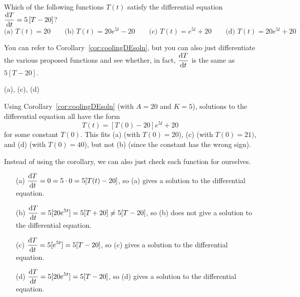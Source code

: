 %
%


\subsection*{\Conceptual}

\begin{Mquestion}
Which of the following functions $T(t)$ satisfy the differential equation
$\ds\diff{T}{t}=5\left[T-20\right]$?
\[\mbox{(a) }
T(t)=20
\qquad
\mbox{(b) }
 T(t)=20e^{5t}-20
\qquad
\mbox{(c) }
 T(t)=e^{5t}+20
\qquad
\mbox{(d) }
 T(t)=20e^{5t}+20
\]
\end{Mquestion}
\begin{hint}
You can refer to Corollary~\ref*{cor:coolingDEsoln},
but you can also just differentiate the various proposed functions and see whether, in fact, $\ds\diff{T}{t}$ is the same as $5[T-20]$.
\end{hint}
\begin{answer} (a), (c), (d)
\end{answer}
\begin{solution}
Using Corollary~\ref*{cor:coolingDEsoln} (with $A=20$ and $K=5$),  solutions to the differential equation all have the form
\[T(t)=[T(0)-20]e^{5t}+20\] for some constant $T(0)$. This fits (a) (with $T(0)=20$), (c) (with $T(0)=21)$, and (d) (with $T(0)=40$), but not (b) (since the constant has the wrong sign).

Instead of using the corollary, we can also just check each function for ourselves.
\begin{itemize}
\item[(a)] $\ds\diff{T}{t}=0=5\cdot0=5[T(t)-20]$, so (a) gives a solution to the differential equation.
\item[(b)] $\ds\diff{T}{t}=5[20e^{5t}]=5[T+20] \neq 5[T-20]$, so (b) does not give a solution to the differential equation.
\item[(c)] $\ds\diff{T}{t}=5[e^{5t}]=5[T-20]$, so (c) gives a solution to the differential equation.
\item[(d)] $\ds\diff{T}{t}=5[20e^{5t}]=5[T-20]$,
so (d) gives a solution to the differential equation.
\end{itemize}
\end{solution}






